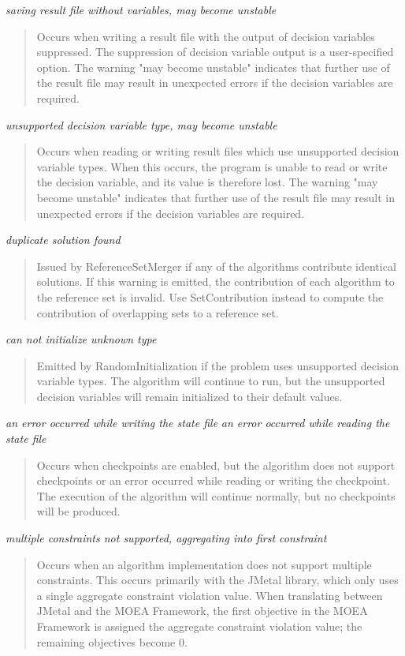 \noindent
\textit{saving result file without variables, may become unstable}
\begin{quote}
  Occurs when writing a result file with the output of decision variables suppressed.  The suppression of decision variable output is a user-specified option.  The warning "may become unstable" indicates that further use of the result file may result in unexpected errors if the decision variables are required.
\end{quote}
  
\noindent
\textit{unsupported decision variable type, may become unstable}
\begin{quote}
  Occurs when reading or writing result files which use unsupported decision variable types.  When this occurs, the program is unable to read or write the decision variable, and its value is therefore lost.  The warning "may become unstable" indicates that further use of the result file may result in unexpected errors if the decision variables are required.
\end{quote}
  
\noindent
\textit{duplicate solution found}
\begin{quote}
  Issued by ReferenceSetMerger if any of the algorithms contribute identical solutions.  If this warning is emitted, the contribution of each algorithm to the reference set is invalid.  Use SetContribution instead to compute the contribution of overlapping sets to a reference set.
\end{quote}
  
\noindent
\textit{can not initialize unknown type}
\begin{quote}
  Emitted by RandomInitialization if the problem uses unsupported decision variable types.  The algorithm will continue to run, but the unsupported decision variables will remain initialized to their default values.
\end{quote}

\noindent
\textit{an error occurred while writing the state file}
\textit{an error occurred while reading the state file}
\begin{quote}
  Occurs when checkpoints are enabled, but the algorithm does not support checkpoints or an error occurred while reading or writing the checkpoint.  The execution of the algorithm will continue normally, but no checkpoints will be produced.
\end{quote}
  
\noindent
\textit{multiple constraints not supported, aggregating into first constraint}
\begin{quote}
  Occurs when an algorithm implementation does not support multiple constraints. This occurs primarily with the JMetal library, which only uses a single aggregate constraint violation value.  When translating between JMetal and the MOEA Framework, the first objective in the MOEA Framework is assigned the aggregate constraint violation value; the remaining objectives become 0.
\end{quote}

